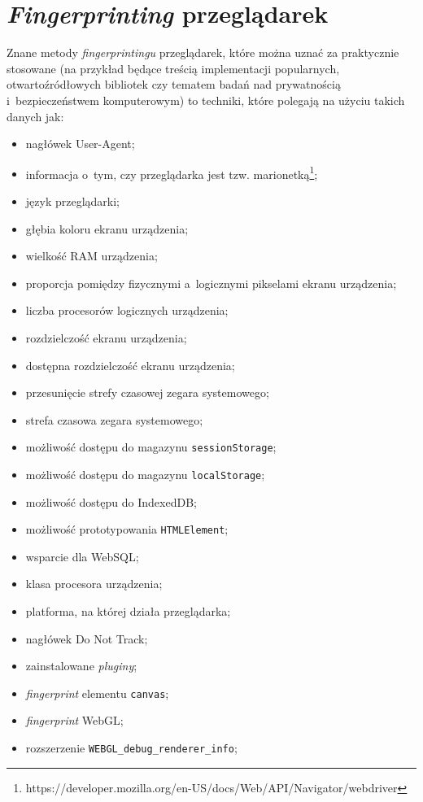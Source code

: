 \section{\emph{Fingerprinting} przeglądarek}
Znane metody \emph{fingerprintingu} przeglądarek, które można uznać za
praktycznie stosowane (na przykład będące treścią implementacji popularnych,
otwartoźródłowych bibliotek czy tematem badań nad prywatnością i~bezpieczeństwem
komputerowym) to techniki, które polegają na użyciu takich danych jak:
\begin{itemize}
	\item nagłówek User-Agent;
	\item informacja o~tym, czy przeglądarka jest tzw.
	      marionetką\footnote{https://developer.mozilla.org/en-US/docs/Web/API/Navigator/webdriver};
	\item język przeglądarki;
	\item głębia koloru ekranu urządzenia;
	\item wielkość RAM urządzenia;
	\item proporcja pomiędzy fizycznymi a~logicznymi pikselami ekranu
	      urządzenia;
	\item liczba procesorów logicznych urządzenia;
	\item rozdzielczość ekranu urządzenia;
	\item dostępna rozdzielczość ekranu urządzenia;
	\item przesunięcie strefy czasowej zegara systemowego;
	\item strefa czasowa zegara systemowego;
	\item możliwość dostępu do magazynu \texttt{sessionStorage};
	\item możliwość dostępu do magazynu \texttt{localStorage};
	\item możliwość dostępu do IndexedDB;
	\item możliwość prototypowania \texttt{HTMLElement};
	\item wsparcie dla WebSQL;
	\item klasa procesora urządzenia;
	\item platforma, na której działa przeglądarka;
	\item nagłówek Do Not Track;
	\item zainstalowane \emph{pluginy};
	\item \emph{fingerprint} elementu \texttt{canvas};
	\item \emph{fingerprint} WebGL;
	\item rozszerzenie \texttt{WEBGL\_debug\_renderer\_info};

\end{itemize}

